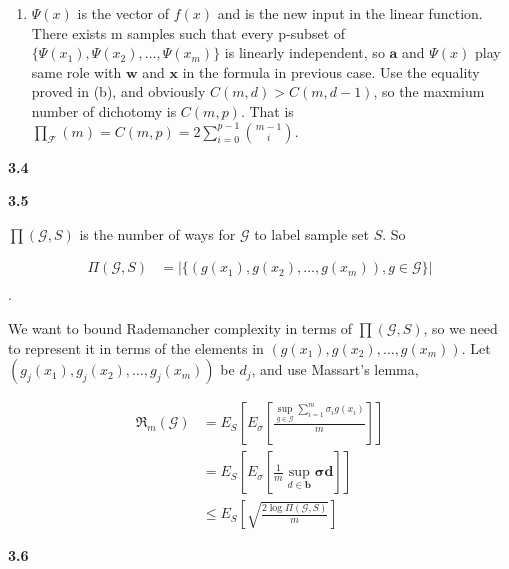 \documentclass[12pt]{article}
\begin{document}
\begin{enumerate}[label=(\alph*), left=0pt]
    \item 
    $\mathcal{\Psi}(x)$ is the vector of $f(x)$ and is the new input in the linear function. There 
    exists m samples such that every p-subset of $\{\mathcal{\Psi}(x_{1}), \mathcal{\Psi}(x_{2}), 
    \dots, \mathcal{\Psi}(x_{m})\}$ is linearly independent, so $\textbf{a}$ and $\mathcal{\Psi}(x)$
    play same role with $\textbf{w}$ and $\textbf{x}$ in the formula in previous case. Use the equality
    proved in (b), and obviously $C(m, d) > C(m, d-1)$, so the maxmium number of dichotomy is $C(m, p)$. 
    That is $\prod_{\mathcal{F}} (m) = C(m, p) = 2 \sum_{i=0}^{p-1} \binom{m-1}{i}$.
\end{enumerate}

\vspace{1em}  %

\noindent \textbf{3.4}

\vspace{1em}  %

\noindent \textbf{3.5}

$\prod (\mathcal{G}, S)$ is the number of ways for $\mathcal{G}$ to label sample set $S$. So

\begin{align*}
    \Pi (\mathcal{G}, S) &= |\{(g(x_{1}), g(x_{2}), \dots, g(x_{m})), g \in \mathcal{G}\}| \\
\end{align*}.

We want to bound Rademancher complexity in terms of $\prod (\mathcal{G}, S)$, so we need to represent
it in terms of the elements in $(g(x_{1}), g(x_{2}), \dots, g(x_{m}))$. Let $(g_{j}(x_{1}), g_{j}(x_{2}), 
\dots, g_{j}(x_{m}))$ be $d_{j}$, and use Massart's lemma, 

\begin{align*}
    \mathfrak{R}_{m}(\mathcal{G}) &= E_{S}[E_{\sigma}[\frac{\sup\limits_{g \in \mathcal{G}} \sum_{i=1}^{m} \sigma_{i} g(x_{i})}{m}]] \\
    &= E_{S}[E_{\sigma}[\frac{1}{m} \sup\limits_{d \in \textbf{b}} \boldsymbol{\sigma} \mathbf{d}]] \\
    &\le E_{S}[\sqrt{\frac{2 \log \Pi (\mathcal{G}, S)}{m}}]
\end{align*}

\vspace{1em}  %

\noindent \textbf{3.6}
\end{document}

